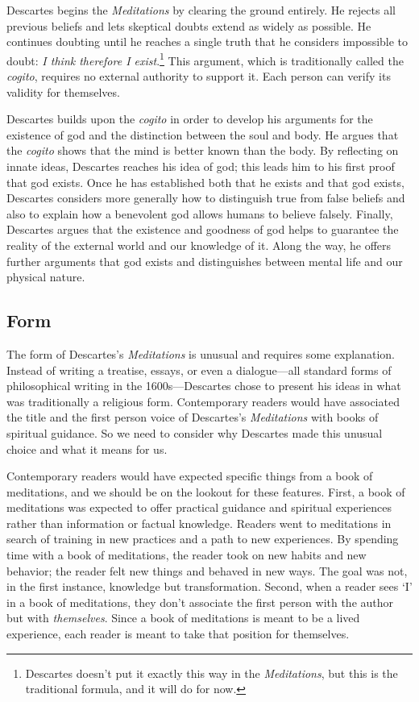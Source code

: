Descartes begins the \textit{Meditations} by clearing the ground entirely. He rejects all previous beliefs and lets skeptical doubts extend as widely as possible. He continues doubting until he reaches a single truth that he considers impossible to doubt: \textit{I think therefore I exist}.\footnote{Descartes doesn't put it exactly this way in the \textit{Meditations}, but this is the traditional formula, and it will do for now.} This argument, which is traditionally called the \textit{cogito}, requires no external authority to support it. Each person can verify its validity for themselves.

Descartes builds upon the \textit{cogito} in order to develop his arguments for the existence of god and the distinction between the soul and body. He argues that the \textit{cogito} shows that the mind is better known than the body. By reflecting on innate ideas, Descartes reaches his idea of god; this leads him to his first proof that god exists. Once he has established both that he exists and that god exists, Descartes considers more generally how to distinguish true from false beliefs and also to explain how a benevolent god allows humans to believe falsely. Finally, Descartes argues that the existence and goodness of god helps to guarantee the reality of the external world and our knowledge of it. Along the way, he offers further arguments that god exists and distinguishes between mental life and our physical nature.

\subsection*{Form}

The form of Descartes's \textit{Meditations} is unusual and requires some explanation. Instead of writing a treatise, essays, or even a dialogue---all standard forms of philosophical writing in the 1600s---Descartes chose to present his ideas in what was traditionally a religious form. Contemporary readers would have associated the title and the first person voice of Descartes's \textit{Meditations} with books of spiritual guidance. So we need to consider why Descartes made this unusual choice and what it means for us.

Contemporary readers would have expected specific things from a book of meditations, and we should be on the lookout for these features. First, a book of meditations was expected to offer practical guidance and spiritual experiences rather than information or factual knowledge. Readers went to meditations in search of training in new practices and a path to new experiences. By spending time with a book of meditations, the reader took on new habits and new behavior; the reader felt new things and behaved in new ways. The goal was not, in the first instance, knowledge but transformation. Second, when a reader sees `I' in a book of meditations, they don't associate the first person with the author but with \textit{themselves}. Since a book of meditations is meant to be a lived experience, each reader is meant to take that position for themselves.

